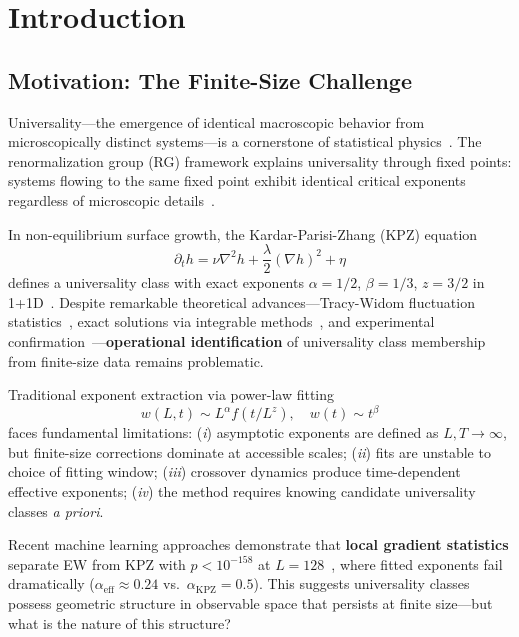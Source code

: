 \documentclass[aps,pre,reprint,amsmath,amssymb,superscriptaddress]{revtex4-2}
\begin{document}
\section{Introduction}
\label{sec:intro}

\subsection{Motivation: The Finite-Size Challenge}

Universality---the emergence of identical macroscopic behavior from microscopically distinct systems---is a cornerstone of statistical physics~\cite{Kadanoff1966,Wilson1975}. The renormalization group (RG) framework explains universality through fixed points: systems flowing to the same fixed point exhibit identical critical exponents regardless of microscopic details~\cite{Cardy1996,Goldenfeld1992}.

In non-equilibrium surface growth, the Kardar-Parisi-Zhang (KPZ) equation~\cite{KPZ1986}
\begin{equation}
\partial_t h = \nu \nabla^2 h + \frac{\lambda}{2}(\nabla h)^2 + \eta
\label{eq:KPZ}
\end{equation}
defines a universality class with exact exponents $\alpha = 1/2$, $\beta = 1/3$, $z=3/2$ in 1+1D~\cite{Prahofer2004}. Despite remarkable theoretical advances---Tracy-Widom fluctuation statistics~\cite{Johansson2000,TracyWidom1994}, exact solutions via integrable methods~\cite{Sasamoto2010,Corwin2012}, and experimental confirmation~\cite{Takeuchi2010}---\textbf{operational identification} of universality class membership from finite-size data remains problematic.

Traditional exponent extraction via power-law fitting
\begin{equation}
w(L,t) \sim L^\alpha f(t/L^z), \quad w(t) \sim t^\beta
\end{equation}
faces fundamental limitations: (\textit{i}) asymptotic exponents are defined as $L,T \to \infty$, but finite-size corrections dominate at accessible scales; (\textit{ii}) fits are unstable to choice of fitting window; (\textit{iii}) crossover dynamics produce time-dependent effective exponents; (\textit{iv}) the method requires knowing candidate universality classes \textit{a priori}.

Recent machine learning approaches demonstrate that \textbf{local gradient statistics} separate EW from KPZ with $p < 10^{-158}$ at $L=128$~\cite{Bentley2026}, where fitted exponents fail dramatically ($\alpha_{\text{eff}} \approx 0.24$ vs.~$\alpha_{\text{KPZ}} = 0.5$). This suggests universality classes possess geometric structure in observable space that persists at finite size---but what is the nature of this structure?
\end{document}
